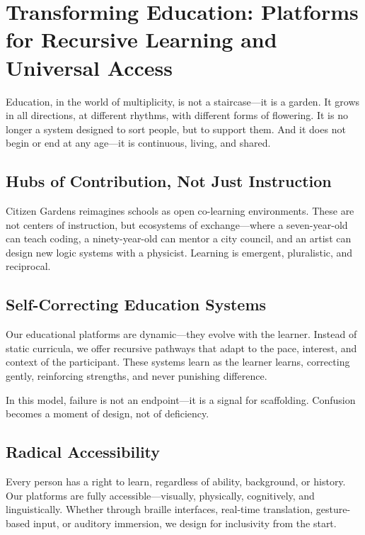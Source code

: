 \documentclass[12pt]{article}
\begin{document}
\section{Transforming Education: Platforms for Recursive Learning and Universal Access}

Education, in the world of multiplicity, is not a staircase—it is a garden. It grows in all directions, at different rhythms, with different forms of flowering. It is no longer a system designed to sort people, but to support them. And it does not begin or end at any age—it is continuous, living, and shared.

\subsection{Hubs of Contribution, Not Just Instruction}

Citizen Gardens reimagines schools as open co-learning environments. These are not centers of instruction, but ecosystems of exchange—where a seven-year-old can teach coding, a ninety-year-old can mentor a city council, and an artist can design new logic systems with a physicist. Learning is emergent, pluralistic, and reciprocal.

\subsection{Self-Correcting Education Systems}

Our educational platforms are dynamic—they evolve with the learner. Instead of static curricula, we offer recursive pathways that adapt to the pace, interest, and context of the participant. These systems learn as the learner learns, correcting gently, reinforcing strengths, and never punishing difference.

In this model, failure is not an endpoint—it is a signal for scaffolding. Confusion becomes a moment of design, not of deficiency.

\subsection{Radical Accessibility}

Every person has a right to learn, regardless of ability, background, or history. Our platforms are fully accessible—visually, physically, cognitively, and linguistically. Whether through braille interfaces, real-time translation, gesture-based input, or auditory immersion, we design for inclusivity from the start.
\end{document}
